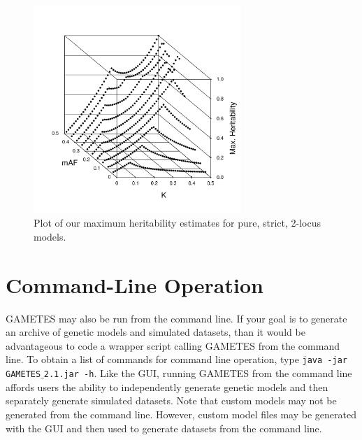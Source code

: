 \documentclass{report}
\begin{document}
\begin{figure}[t]
\centerline{\includegraphics[width=0.7\textwidth]{Figure8_UG.pdf}}%
\caption{Plot of our maximum heritability estimates for pure, strict, 2-locus models.}
\label{maxherfig}
\end{figure}

\section{Command-Line Operation}\label{cmdop}
GAMETES may also be run from the command line.  If your goal is to generate an archive of genetic models and simulated datasets, than it would be advantageous to code a wrapper script calling GAMETES from the command line.  To obtain a list of commands for command line operation, type \texttt{java -jar GAMETES$\_$2.1.jar -h}.  Like the GUI, running GAMETES from the command line affords users the ability to independently generate genetic models and then separately generate simulated datasets.  Note that custom models may not be generated from the command line.  However, custom model files may be generated with the GUI and then used to generate datasets from the command line.
\end{document}
